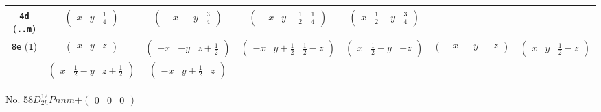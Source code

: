 \documentclass[fleqn,9pt,landscape]{jsarticle}
\begin{document}
\begin{center}
\begin{longtable}{ccccccc}
{\tt 4d} ({\tt ..m}) & $ \begin{pmatrix} x & y & \frac{1}{4} \end{pmatrix} $ & $ \begin{pmatrix} - x & - y & \frac{3}{4} \end{pmatrix} $ & $ \begin{pmatrix} - x & y + \frac{1}{2} & \frac{1}{4} \end{pmatrix} $ & $ \begin{pmatrix} x & \frac{1}{2} - y & \frac{3}{4} \end{pmatrix} $ & $  $ & $  $ \\ \hline
{\tt 8e} ({\tt 1}) & $ \begin{pmatrix} x & y & z \end{pmatrix} $ & $ \begin{pmatrix} - x & - y & z + \frac{1}{2} \end{pmatrix} $ & $ \begin{pmatrix} - x & y + \frac{1}{2} & \frac{1}{2} - z \end{pmatrix} $ & $ \begin{pmatrix} x & \frac{1}{2} - y & - z \end{pmatrix} $ & $ \begin{pmatrix} - x & - y & - z \end{pmatrix} $ & $ \begin{pmatrix} x & y & \frac{1}{2} - z \end{pmatrix} $ \\
& $ \begin{pmatrix} x & \frac{1}{2} - y & z + \frac{1}{2} \end{pmatrix} $ & $ \begin{pmatrix} - x & y + \frac{1}{2} & z \end{pmatrix} $ & $  $ & $  $ & $  $ & $  $ \\
\end{longtable}
\end{center}
\newpage
No. 58\quad$D_{2h}^{12}$\quad$Pnnm$\quad[ orthorhombic ]\quad$+\begin{pmatrix} 0 & 0 & 0 \end{pmatrix}$
\end{document}
